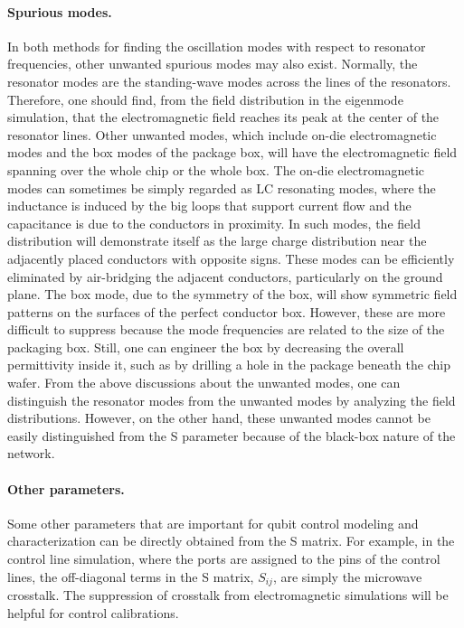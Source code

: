 \documentclass[a4paper,onecolumn,11pt,unpublished]{quantumarticle}
\begin{document}
\paragraph{Spurious modes. }
In both methods for finding the oscillation modes with respect to resonator frequencies, other unwanted spurious modes may also exist.
Normally, the resonator modes are the standing-wave modes across the lines of the resonators. Therefore, one should find, from the field distribution in the eigenmode simulation, that the electromagnetic field reaches its peak at the center of the resonator lines. Other unwanted modes, which include on-die electromagnetic modes and the box modes of the package box, will have the electromagnetic field spanning over the whole chip or the whole box. 
The on-die electromagnetic modes can sometimes be simply regarded as LC resonating modes, where the inductance is induced by the big loops that support current flow and the capacitance is due to the conductors in proximity. In such modes, the field distribution will demonstrate itself as the large charge distribution near the adjacently placed conductors with opposite signs. 
These modes can be efficiently eliminated by air-bridging the adjacent conductors, particularly on the ground plane. 
The box mode, due to the symmetry of the box, will show symmetric field patterns on the surfaces of the perfect conductor box. 
However, these are more difficult to suppress because the mode frequencies are related to the size of the packaging box. Still, one can engineer the box by decreasing the overall permittivity inside it, such as by drilling a hole in the package beneath the chip wafer. From the above discussions about the unwanted modes, one can distinguish the resonator modes from the unwanted modes by analyzing the field distributions. 
However, on the other hand, these unwanted modes cannot be easily distinguished from the S parameter because of the black-box nature of the network. 

\paragraph{Other parameters.}
Some other parameters that are important for qubit control modeling and characterization can be directly obtained from the S matrix. For example, in the control line simulation, where the ports are assigned to the pins of the control lines, the off-diagonal terms in the S matrix, $S_{ij}$, are simply the microwave crosstalk. The suppression of crosstalk from electromagnetic simulations will be helpful for control calibrations. 
\end{document}
